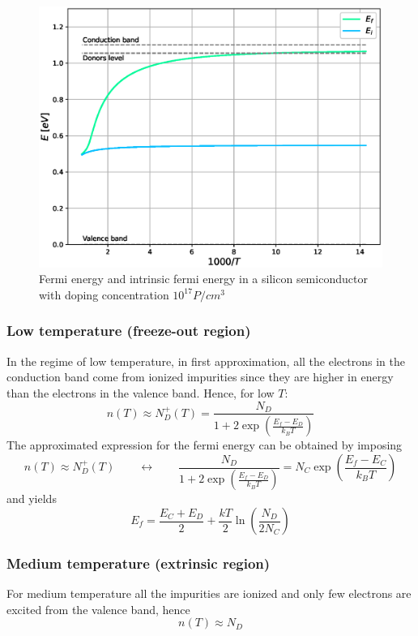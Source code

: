 \documentclass{article}
\begin{document}
\begin{figure}[h]
    \centering 
    \includegraphics[scale=0.6]{efei.eps}
    \caption{Fermi energy and intrinsic fermi energy in a silicon semiconductor with doping concentration $10^{17} P/cm^3$}
    \label{fig:efei}
\end{figure}

\subsubsection*{Low temperature (freeze-out region)}
In the regime of low temperature, in first approximation, all the electrons in the conduction band come from ionized impurities since they are higher in energy than the electrons in the valence band.
Hence, for low $T$:
\begin{equation*}
    n(T) \approx N_D^+(T) = \frac{N_D}{1 + 2\exp\left(\frac{E_f-E_D}{k_BT}\right)}
\end{equation*}
The approximated expression for the fermi energy can be obtained by imposing 
\begin{equation*}
    n(T) \approx N_D^+(T) \qquad \longleftrightarrow \qquad \frac{N_D}{1 + 2\exp\left(\frac{E_f-E_D}{k_BT}\right)} = N_C \exp\left(\frac{E_f-E_C}{k_BT}\right)
\end{equation*}
and yields
\begin{equation*}
    E_{f}=\frac{E_{C}+E_{D}}{2}+\frac{k T}{2}\ln\left(\frac{N_D}{2N_C}\right)
\end{equation*}
\subsubsection*{Medium temperature (extrinsic region)}
For medium temperature all the impurities are ionized and only few electrons are excited from the valence band, hence 
\begin{equation*}
    n(T) \approx N_D
\end{equation*}
\end{document}
